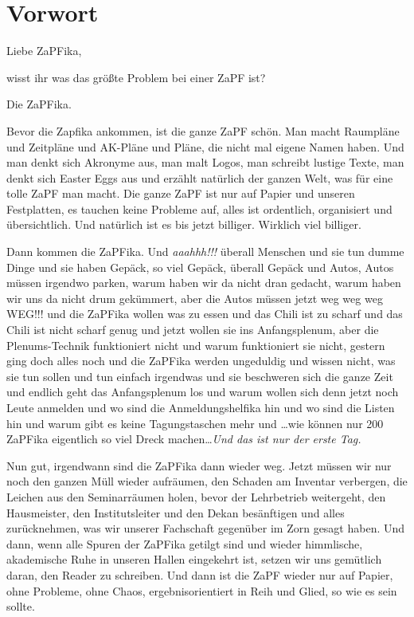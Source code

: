 
\section{Vorwort}

Liebe ZaPFika,

wisst ihr was das größte Problem bei einer ZaPF ist?

Die ZaPFika.

Bevor die Zapfika ankommen, ist die ganze ZaPF schön. Man macht Raumpläne und Zeitpläne und AK-Pläne und Pläne, die nicht mal eigene Namen haben. Und man denkt sich Akronyme aus, man malt Logos, man schreibt lustige Texte, man denkt sich Easter Eggs aus und erzählt natürlich der ganzen Welt, was für eine tolle ZaPF man macht. Die ganze ZaPF ist nur auf Papier und unseren Festplatten, es tauchen keine Probleme auf, alles ist ordentlich, organisiert und übersichtlich. Und natürlich ist es bis jetzt billiger. Wirklich viel billiger.

Dann kommen die ZaPFika. Und \textit{aaahhh!!!} überall Menschen und sie tun dumme Dinge und sie haben Gepäck, so viel Gepäck, überall Gepäck und Autos, Autos müssen irgendwo parken, warum haben wir da nicht dran gedacht, warum haben wir uns da nicht drum gekümmert, aber die Autos müssen jetzt weg weg weg WEG!!! und die ZaPFika wollen was zu essen und das Chili ist zu scharf und das Chili ist nicht scharf genug und jetzt wollen sie ins Anfangsplenum, aber die Plenums-Technik funktioniert nicht und warum funktioniert sie nicht, gestern ging doch alles noch und die ZaPFika werden ungeduldig und wissen nicht, was sie tun sollen und tun einfach irgendwas und sie beschweren sich die ganze Zeit und endlich geht das Anfangsplenum los und warum wollen sich denn jetzt noch Leute anmelden und wo sind die Anmeldungshelfika hin und wo sind die Listen hin und warum gibt es keine Tagungstaschen mehr und \dots wie können nur 200 ZaPFika eigentlich so viel Dreck machen\dots\textit{Und das ist nur der erste Tag.}

Nun gut, irgendwann sind die ZaPFika dann wieder weg. Jetzt müssen wir nur noch den ganzen Müll wieder aufräumen, den Schaden am Inventar verbergen, die Leichen aus den Seminarräumen holen, bevor der Lehrbetrieb weitergeht, den Hausmeister, den Institutsleiter und den Dekan besänftigen und alles zurücknehmen, was wir unserer Fachschaft gegenüber im Zorn gesagt haben. Und dann, wenn alle Spuren der ZaPFika getilgt sind und wieder himmlische, akademische Ruhe in unseren Hallen eingekehrt ist, setzen wir uns gemütlich daran, den Reader zu schreiben. Und dann ist die ZaPF wieder nur auf Papier, ohne Probleme, ohne Chaos, ergebnisorientiert in Reih und Glied, so wie es sein sollte.


